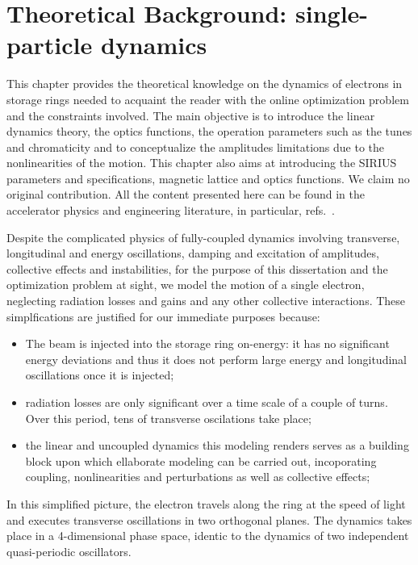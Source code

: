 \chapter{Theoretical Background: single-particle dynamics}
This chapter provides the theoretical knowledge on the dynamics of electrons in storage rings needed to acquaint the reader with the online optimization problem and the constraints involved. The main objective is to introduce the linear dynamics theory, the optics functions, the operation parameters such as the tunes and chromaticity and to conceptualize the amplitudes limitations due to the nonlinearities of the motion. This chapter also aims at introducing the SIRIUS parameters and specifications, magnetic lattice and optics functions. We claim no original contribution. All the content presented here can be found in the accelerator physics and engineering literature, in particular, refs.~\cite{sands_physics_1969,lee_accelerator_2004,wiedemann_particle_2015,wolski_beam_2014}.

Despite the complicated physics of fully-coupled dynamics involving transverse, longitudinal and energy oscillations, damping and excitation of amplitudes, collective effects and instabilities, for the purpose of this dissertation and the optimization problem at sight, we model the motion of a single electron, neglecting radiation losses and gains and any other collective interactions. These simplfications are justified for our immediate purposes because:
\begin{itemize}
    \item The beam is injected into the storage ring on-energy: it has no significant energy deviations and thus it does not perform large energy and longitudinal oscillations once it is injected;
    \item radiation losses are only significant over a time scale of a couple of turns. Over this period, tens of transverse oscilations take place;
    \item the linear and uncoupled dynamics this modeling renders serves as a building block upon which ellaborate modeling can be carried out, incoporating coupling, nonlinearities and perturbations as well as collective effects;
\end{itemize}
In this simplified picture, the electron travels along the ring at the speed of light and executes transverse oscillations in two orthogonal planes. The dynamics takes place in a 4-dimensional phase space, identic to the  dynamics of two independent quasi-periodic oscillators.

